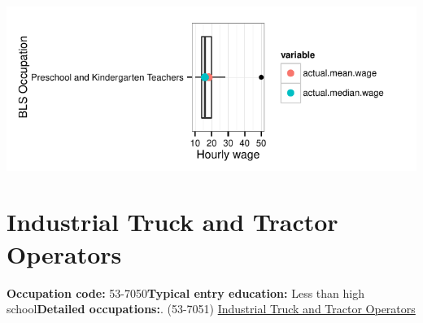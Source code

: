 \documentclass[a4paper,10pt]{article}\usepackage[]{graphicx}\usepackage[]{color}
\makeatletter
\def\maxwidth{ %
  \ifdim\Gin@nat@width>\linewidth
    \linewidth
  \else
    \Gin@nat@width
  \fi
}
\makeatother
\begin{document}
{\centering \includegraphics[width=\maxwidth]{figure/unnamed-chunk-267} 

}


\newpage\section{Industrial Truck and Tractor Operators}\textbf{Occupation code:} 53-7050\newline\textbf{Typical entry education:} Less than high school\newline\textbf{Detailed occupations:}. (53-7051)  \href{http://www.bls.gov/oes/current/oes537051.htm}{Industrial Truck and Tractor Operators}\newline%
\end{document}

